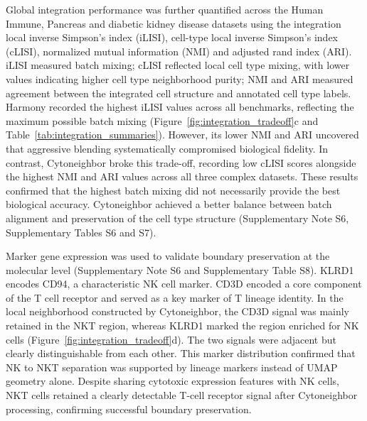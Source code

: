 \documentclass[11pt]{article}
\begin{document}
Global integration performance was further quantified across the Human Immune, Pancreas and diabetic kidney disease datasets using the integration local inverse Simpson's index (iLISI), cell-type local inverse Simpson's index (cLISI), normalized mutual information (NMI) and adjusted rand index (ARI)\cite{Luecken2022IntegrationBenchmark,HubertArabie1985ARI,Vinh2010NMI}. iLISI measured batch mixing; cLISI reflected local cell type mixing, with lower values indicating higher cell type neighborhood purity; NMI and ARI measured agreement between the integrated cell structure and annotated cell type labels. Harmony recorded the highest iLISI values across all benchmarks, reflecting the maximum possible batch mixing (Figure~\ref{fig:integration_tradeoff}c and Table~\ref{tab:integration_summaries}). However, its lower NMI and ARI uncovered that aggressive blending systematically compromised biological fidelity. In contrast, Cytoneighbor broke this trade-off, recording low cLISI scores alongside the highest NMI and ARI values across all three complex datasets. These results confirmed that the highest batch mixing did not necessarily provide the best biological accuracy. Cytoneighbor achieved a better balance between batch alignment and preservation of the cell type structure (Supplementary Note S6, Supplementary Tables S6 and S7).

Marker gene expression was used to validate boundary preservation at the molecular level (Supplementary Note S6 and Supplementary Table S8). KLRD1 encodes CD94, a characteristic NK cell marker. CD3D encoded a core component of the T cell receptor and served as a key marker of T lineage identity. In the local neighborhood constructed by Cytoneighbor, the CD3D signal was mainly retained in the NKT region, whereas KLRD1 marked the region enriched for NK cells (Figure~\ref{fig:integration_tradeoff}d). The two signals were adjacent but clearly distinguishable from each other. This marker distribution confirmed that NK to NKT separation was supported by lineage markers instead of UMAP geometry alone. Despite sharing cytotoxic expression features with NK cells, NKT cells retained a clearly detectable T-cell receptor signal after Cytoneighbor processing, confirming successful boundary preservation.
\end{document}
